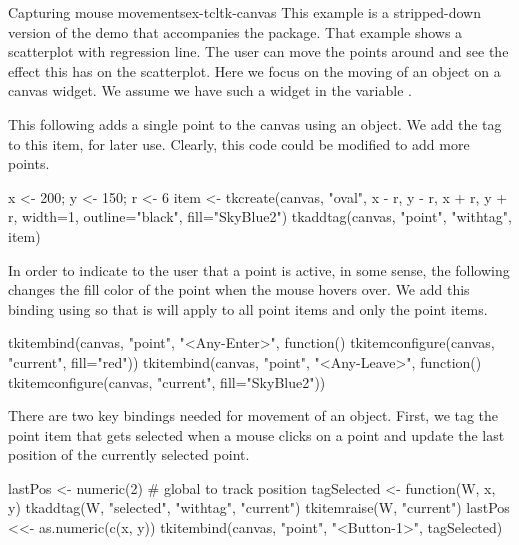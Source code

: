 \begin{example}{Capturing mouse movements}{ex-tcltk-canvas}
This example is a stripped-down version of the  demo
that accompanies the  package. That example shows a
scatterplot with regression line. The user can move the points around
and see the effect this has on the scatterplot. Here we focus on the
moving of an object on a canvas widget. We assume we have such a
widget in the variable .


This following adds a single point to the canvas using an
 object. We add the  tag to this item, for
later use. Clearly, this code could be modified to add more points.
\begin{Schunk}
\begin{Sinput}
 x <- 200; y <- 150; r <- 6
 item <- tkcreate(canvas, "oval", x - r, y - r, x + r, y + r,
                  width=1, outline="black",
                  fill="SkyBlue2")
 tkaddtag(canvas, "point", "withtag", item)
\end{Sinput}
\end{Schunk}

In order to indicate to the user that a point is active, in some
sense, the following changes the fill color of the point when the
mouse hovers over. We add this binding using 
so that is will apply to all point items and only the point items.
\begin{Schunk}
\begin{Sinput}
 tkitembind(canvas, "point", "<Any-Enter>", function()
            tkitemconfigure(canvas, "current", fill="red"))
 tkitembind(canvas, "point", "<Any-Leave>", function()
            tkitemconfigure(canvas, "current", fill="SkyBlue2"))
\end{Sinput}
\end{Schunk}

There are two key bindings needed for movement of an object. First, we
tag the point item that gets selected when a mouse clicks on a point
and update the last position of the currently selected point.
\begin{Schunk}
\begin{Sinput}
 lastPos <- numeric(2)            # global to track position
 tagSelected <- function(W, x, y) {
   tkaddtag(W,  "selected",  "withtag",  "current")
   tkitemraise(W, "current")
   lastPos <<- as.numeric(c(x, y))
 }
 tkitembind(canvas, "point", "<Button-1>",  tagSelected)
\end{Sinput}
\end{Schunk}


\end{example}
